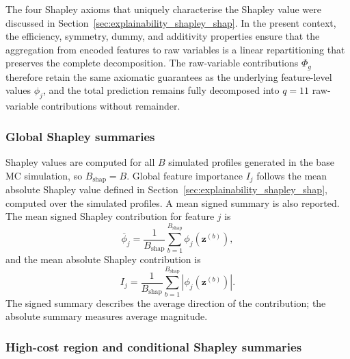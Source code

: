 The four Shapley axioms that uniquely characterise the Shapley value
\citep{shapley1953value} were discussed in
Section~\ref{sec:explainability_shapley_shap}.  In the present context, the
efficiency, symmetry, dummy, and additivity properties ensure that the
aggregation from encoded features to raw variables is a linear
repartitioning that preserves the complete decomposition.  The raw-variable
contributions $\Phi_g$ therefore retain the same axiomatic guarantees as the
underlying feature-level values $\phi_j$, and the total prediction remains
fully decomposed into $q = 11$ raw-variable contributions without remainder.

\subsubsection{Global Shapley summaries}

Shapley values are computed for all $B$ simulated profiles generated in the
base MC simulation, so $B_{\mathrm{shap}} = B$. Global feature
importance $I_j$ follows the mean absolute Shapley value defined in
Section~\ref{sec:explainability_shapley_shap}, computed over the simulated
profiles. A mean signed summary is also reported.
The mean signed Shapley contribution for feature $j$ is
\begin{equation}
    \overline{\phi}_{j}
    =
    \frac{1}{B_{\mathrm{shap}}}
    \sum_{b=1}^{B_{\mathrm{shap}}}
    \phi_j
    \left(
        \mathbf{z}^{(b)}
    \right),
    \label{eq:mean_signed_shap_ch3}
\end{equation}
and the mean absolute Shapley contribution is
\begin{equation}
    I_j
    =
    \frac{1}{B_{\mathrm{shap}}}
    \sum_{b=1}^{B_{\mathrm{shap}}}
    \left|
        \phi_j
        \left(
            \mathbf{z}^{(b)}
        \right)
    \right|.
    \label{eq:mean_absolute_shap_ch3}
\end{equation}
The signed summary describes the average direction of the contribution; the
absolute summary measures average magnitude.

\subsubsection{High-cost region and conditional Shapley summaries}


